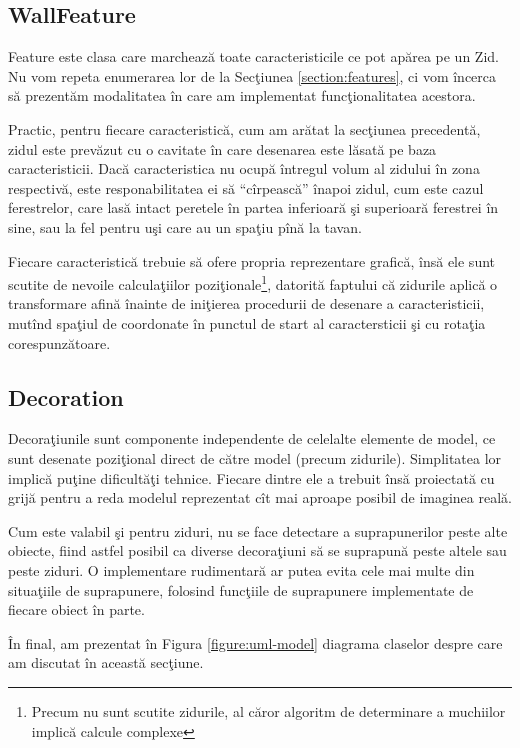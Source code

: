 \subsection{WallFeature}

Feature este clasa care marchează toate caracteristicile ce pot apărea pe un
Zid. Nu vom repeta enumerarea lor de la Secţiunea \ref{section:features}, ci vom
încerca să prezentăm modalitatea în care am implementat funcţionalitatea
acestora.

Practic, pentru fiecare caracteristică, cum am arătat la secţiunea precedentă,
zidul este prevăzut cu o cavitate în care desenarea este lăsată pe baza
caracteristicii. Dacă caracteristica nu ocupă întregul volum al zidului în zona
respectivă, este responabilitatea ei să ``cîrpească'' înapoi zidul, cum este
cazul ferestrelor, care lasă intact peretele în partea inferioară şi superioară
ferestrei în sine, sau la fel pentru uşi care au un spaţiu pînă la tavan.

Fiecare caracteristică trebuie să ofere propria reprezentare grafică, însă ele
sunt scutite de nevoile calculaţiilor poziţionale\footnote{Precum nu sunt
scutite zidurile, al căror algoritm de determinare a muchiilor implică calcule
complexe}, datorită faptului că zidurile aplică o transformare afină înainte de
iniţierea procedurii de desenare a caracteristicii, mutînd spaţiul de coordonate
în punctul de start al caractersticii şi cu rotaţia corespunzătoare.

\subsection{Decoration}

Decoraţiunile sunt componente independente de celelalte elemente de model, ce
sunt desenate poziţional direct de către model (precum zidurile). Simplitatea
lor implică puţine dificultăţi tehnice. Fiecare dintre ele a trebuit însă
proiectată cu grijă pentru a reda modelul reprezentat cît mai aproape posibil de
imaginea reală.

Cum este valabil şi pentru ziduri, nu se face detectare a suprapunerilor peste
alte obiecte, fiind astfel posibil ca diverse decoraţiuni să se suprapună peste
altele sau peste ziduri. O implementare rudimentară ar putea evita cele mai
multe din situaţiile de suprapunere, folosind funcţiile de suprapunere
implementate de fiecare obiect în parte.

În final, am prezentat în Figura \ref{figure:uml-model} diagrama claselor despre
care am discutat în această secţiune.

